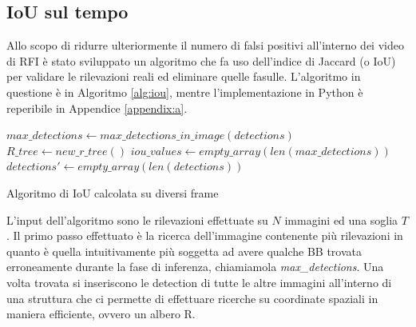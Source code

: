 \subsection{IoU sul tempo}
\label{sec:iou_over_time}
Allo scopo di ridurre ulteriormente il numero di falsi positivi all'interno dei video di \ac{RFI} è stato sviluppato un algoritmo che fa uso dell'indice di Jaccard (o \ac{IoU}) per validare le rilevazioni reali ed eliminare quelle fasulle. 
L'algoritmo in questione è in Algoritmo \ref{alg:iou}, mentre l'implementazione in Python è reperibile in Appendice \ref{appendix:a}.


\begin{algorithm}[H]
    \SetAlgoLined
    $ max\_detections \leftarrow max\_detections\_in\_image(detections)$ \;
    $ R\_tree \leftarrow new\_r\_tree() $\;
    $iou\_values \leftarrow empty\_array(len(max\_detections))$\;
    $detections' \leftarrow empty\_array(len(detections))$\;
    \caption{Algoritmo di IoU calcolata su diversi frame}
    \label{alg:iou}
\end{algorithm}

L'input dell'algoritmo sono le rilevazioni effettuate su $N$ immagini ed una soglia $T$. 
Il primo passo effettuato è la ricerca dell'immagine contenente più rilevazioni in quanto è quella intuitivamente più soggetta ad avere qualche \ac{BB} trovata erroneamente durante la fase di inferenza, chiamiamola \textit{max\_detections}. Una volta trovata si inseriscono le detection di tutte le altre immagini all'interno di una struttura che ci permette di effettuare ricerche su coordinate spaziali in maniera efficiente, ovvero un albero R.


